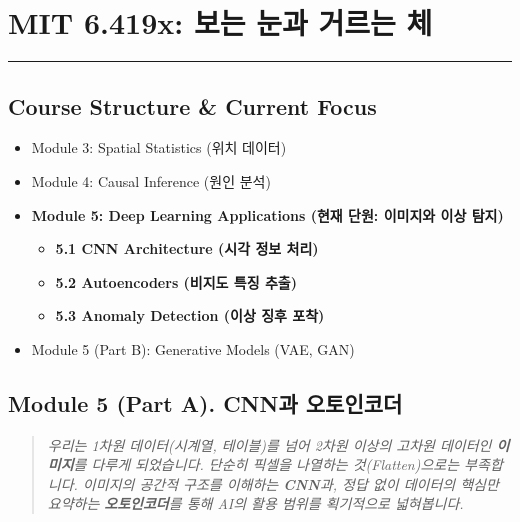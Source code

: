 \documentclass[11pt,a4paper]{book}
\theoremstyle{definition}
\begin{document}
\chapter{MIT 6.419x: 보는 눈과 거르는 체}
\label{ch:lecture11}


\vspace{1cm}
\hrule
\vspace{1cm}

\section*{Course Structure \& Current Focus}
\begin{itemize}
    \item Module 3: Spatial Statistics (위치 데이터)
    \item Module 4: Causal Inference (원인 분석)
    \item \textbf{\textcolor{mainblue}{Module 5: Deep Learning Applications (현재 단원: 이미지와 이상 탐지)}}
    \begin{itemize}
        \item \textbf{5.1 CNN Architecture (시각 정보 처리)}
        \item \textbf{5.2 Autoencoders (비지도 특징 추출)}
        \item \textbf{5.3 Anomaly Detection (이상 징후 포착)}
    \end{itemize}
    \item Module 5 (Part B): Generative Models (VAE, GAN)
\end{itemize}


\section{Module 5 (Part A). CNN과 오토인코더}

\begin{quote}
\textit{우리는 1차원 데이터(시계열, 테이블)를 넘어 2차원 이상의 고차원 데이터인 \textbf{이미지}를 다루게 되었습니다. 단순히 픽셀을 나열하는 것(Flatten)으로는 부족합니다. 이미지의 공간적 구조를 이해하는 \textbf{CNN}과, 정답 없이 데이터의 핵심만 요약하는 \textbf{오토인코더}를 통해 AI의 활용 범위를 획기적으로 넓혀봅니다.}
\end{quote}
\end{document}
